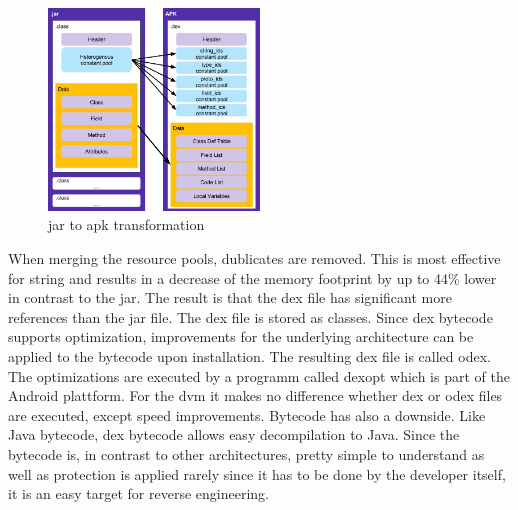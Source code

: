 \begin{figure}[h]
    \centering
    \includegraphics[width=0.5\textwidth]{data/java.png}
    \caption{\gls{jar} to \gls{apk} transformation \cite{googleDalvik}}
    \label{fig:java}
\end{figure}

When merging the resource pools, dublicates are removed.
This is most effective for string and results in a decrease of the memory footprint by up to 44\% lower in contrast to the \gls{jar}.
The result is that the \gls{dex} file has significant more references than the \gls{jar} file.
The \gls{dex} file is stored as classes.\cite{ehringerDalvik}
\newline
\newline
Since \gls{dex} bytecode supports optimization, improvements for the underlying architecture can be applied to the bytecode upon installation.
The resulting \gls{dex} file is called \gls{odex}.
The optimizations are executed by a programm called dexopt which is part of the Android plattform.
For the \gls{dvm} it makes no difference whether \gls{dex} or \gls{odex} files are executed, except speed improvements.
\newline
Bytecode has also a downside.
Like Java bytecode, \gls{dex} bytecode allows easy decompilation to Java.
Since the bytecode is, in contrast to other architectures, pretty simple to understand as well as protection is applied rarely since it has to be done by the developer itself, it is an easy target for reverse engineering.
